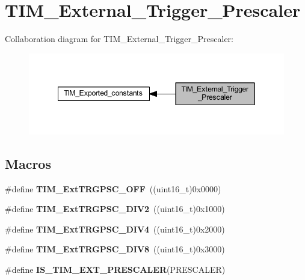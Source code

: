 \hypertarget{group___t_i_m___external___trigger___prescaler}{}\section{T\+I\+M\+\_\+\+External\+\_\+\+Trigger\+\_\+\+Prescaler}
\label{group___t_i_m___external___trigger___prescaler}
Collaboration diagram for T\+I\+M\+\_\+\+External\+\_\+\+Trigger\+\_\+\+Prescaler\+:
\nopagebreak
\begin{figure}[H]
\begin{center}
\leavevmode
\includegraphics[width=349pt]{group___t_i_m___external___trigger___prescaler}
\end{center}
\end{figure}
\subsection*{Macros}
\begin{DoxyCompactItemize}
\item 
\mbox{\label{group___t_i_m___external___trigger___prescaler_ga1b21757d5d1b708edca7e20481797e96}} 
\#define {\bfseries T\+I\+M\+\_\+\+Ext\+T\+R\+G\+P\+S\+C\+\_\+\+O\+FF}~((uint16\+\_\+t)0x0000)
\item 
\mbox{\label{group___t_i_m___external___trigger___prescaler_ga446ed7f1bc28bcb295c43886da582e47}} 
\#define {\bfseries T\+I\+M\+\_\+\+Ext\+T\+R\+G\+P\+S\+C\+\_\+\+D\+I\+V2}~((uint16\+\_\+t)0x1000)
\item 
\mbox{\label{group___t_i_m___external___trigger___prescaler_ga1de0031af7654fac2f29705f1da146c6}} 
\#define {\bfseries T\+I\+M\+\_\+\+Ext\+T\+R\+G\+P\+S\+C\+\_\+\+D\+I\+V4}~((uint16\+\_\+t)0x2000)
\item 
\mbox{\label{group___t_i_m___external___trigger___prescaler_gac2fe5014d69a93ce0a22b9f3f5a7d19a}} 
\#define {\bfseries T\+I\+M\+\_\+\+Ext\+T\+R\+G\+P\+S\+C\+\_\+\+D\+I\+V8}~((uint16\+\_\+t)0x3000)
\item 
\#define {\bfseries I\+S\+\_\+\+T\+I\+M\+\_\+\+E\+X\+T\+\_\+\+P\+R\+E\+S\+C\+A\+L\+ER}(P\+R\+E\+S\+C\+A\+L\+ER)
\end{DoxyCompactItemize}


